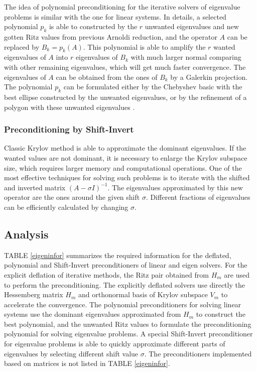 The idea of polynomial preconditioning for the iterative solvers of eigenvalue problems is similar with the one for linear systems. In details, a selected polynomial $p_k$ is able to constructed by the $r$ unwanted eigenvalues and new gotten Ritz values from previous Arnoldi reduction, and the operator $A$ can be replaced by $B_k=p_k(A)$. This polynomial is able to amplify the $r$ wanted eigenvalues of $A$ into $r$ eigenvalues of $B_k$ with much larger normal comparing with other remaining eigenvalues, which will get much faster convergence. The eigenvalues of $A$ can be obtained from the ones of $B_k$ by a Galerkin projection. The polynomial $p_k$ can be formulated either by the Chebyshev basic with the best ellipse constructed by the unwanted eigenvalues\cite{saad1987least}, or by the refinement of a polygon with these unwanted eigenvalues \cite{manteuffel1977tchebychev}.

\subsubsection{Preconditioning by Shift-Invert}

Classic Krylov method is able to approximate the dominant eigenvalues. If the wanted values are not dominant, it is necessary to enlarge the Krylov subspace size, which requires larger memory and computational operations. One of the most effective techniques for solving such problems is to iterate with the shifted and inverted matrix $(A-\sigma I)^{-1}$. The eigenvalues approximated by this new operator are the ones around the given shift $\sigma$. Different fractions of eigenvalues can be efficiently calculated by changing $\sigma$.

\subsection{Analysis}

TABLE \ref{eigeninfor} summarizes the required information for the deflated, polynomial and Shift-Invert preconditioners of linear and eigen solvers. For the explicit deflation of iterative methods, the Ritz pair obtained from $H_m$ are used to perform the preconditioning. The explicitly deflated solvers use directly the Hessemberg matrix $H_m$ and orthonormal basis of Krylov subspace $V_m$ to accelerate the convergence. The polynomial preconditioners for solving linear systems use the dominant eigenvalues approximated from $H_m$ to construct the best polynomial, and the unwanted Ritz values to formulate the preconditioning polynomial for solving eigenvalue problems. A special Shift-Invert preconditioner for eigenvalue problems is able to quickly approximate different parts of eigenvalues by selecting different shift value $\sigma$. The preconditioners implemented based on matrices is not listed in TABLE \ref{eigeninfor}.

